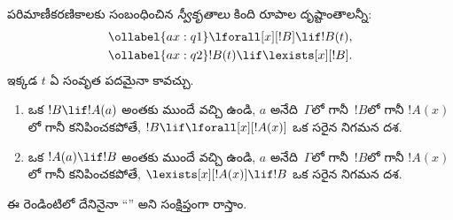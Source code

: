 \documentclass[../../../include/open-logic-section]{subfiles}
\begin{document}


\begin{defn}[పరిమాణీకరణికాల స్వీకృతాలు]
పరిమాణీకరణికాలకు సంబంధించిన \emph{స్వీకృతాలు} కింది రూపాల
దృష్టాంతాలన్నీ:
\begin{align}
\ollabel{ax:q1} & \lforall[x][!B] \lif !B(t), \\
\ollabel{ax:q2} & !B(t) \lif \lexists[x][!B].
\end{align}
ఇక్కడ $t$ ఏ సంవృత పదమైనా కావచ్చు.
\end{defn}

\begin{defn}[పరిమాణీకరణికాల నియమాలు]\begin{enumerate}
\item ఒక  $!B \lif !A(a)$ అంతకు ముందే వచ్చి ఉండి, $a$
  అనేది~$\Gamma$లో గానీ~$!B$లో గానీ $!A(x)$లో గానీ కనిపించకపోతే, $!B \lif
  \lforall[x][!A(x)]$ ఒక సరైన నిగమన దశ.
\item ఒక  $!A(a) \lif !B$ అంతకు ముందే వచ్చి ఉండి, $a$
  అనేది~$\Gamma$లో గానీ~$!B$లో గానీ $!A(x)$లో గానీ కనిపించకపోతే,
  $\lexists[x][!A(x)] \lif !B$ ఒక సరైన నిగమన దశ.
\end{enumerate}\end{defn}

ఈ రెండింటిలో దేనినైనా ``\QR'' అని సంక్షిప్తంగా రాస్తాం.
\end{document}
